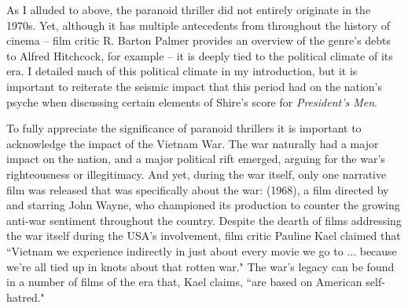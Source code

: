 As I alluded to above, the paranoid thriller did not entirely originate in the 1970s.
Yet, although it has multiple antecedents from throughout the history of cinema – film critic R. Barton Palmer provides an overview of the genre's debts to Alfred Hitchcock, for example – it is deeply tied to the political climate of its era.\autocites[][85-108]{palmer_hitchcock_2006}
I detailed much of this political climate in my introduction, but it is important to reiterate the seismic impact that this period had on the nation's psyche when discussing certain elements of Shire's score for \textit{President's Men}.

To fully appreciate the significance of paranoid thrillers it is important to acknowledge the impact of the Vietnam War.
The war naturally had a major impact on the nation, and a major political rift emerged, arguing for the war's righteousness or illegitimacy.
And yet, during the war itself, only one narrative film was released that was specifically about the war:  (1968), a film directed by and starring John Wayne, who championed its production to counter the growing anti-war sentiment throughout the country.
Despite the dearth of films addressing the war itself during the USA's involvement, film critic Pauline Kael claimed that ``Vietnam we experience indirectly in just about every movie we go to ... because we're all tied up in knots about that rotten war."\autocites[][35]{lerman_pauline_1996}
The war's legacy can be found in a number of films of the era that, Kael claims, ``are based on American self-hatred."\autocites[][35]{lerman_pauline_1996}

